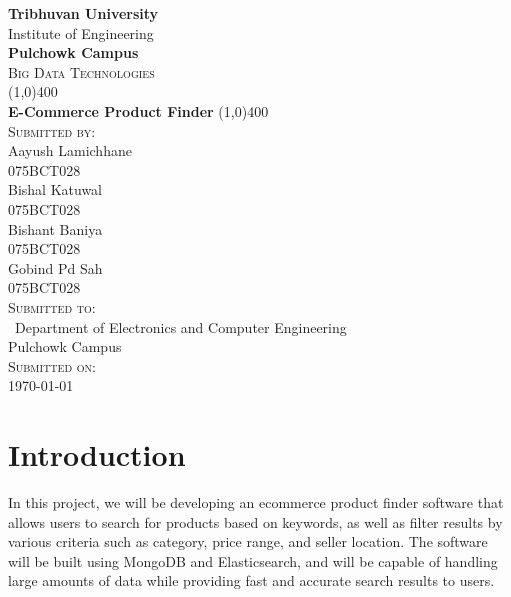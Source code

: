 \documentclass[12pt]{article}
\begin{document}
\begin{titlepage}
    \begin{center}
        \huge{\bfseries  Tribhuvan University}\\
        \Large{Institute of Engineering}\\
        \huge{ \bfseries  Pulchowk Campus}\\[3.2cm]


        \textsc{\Large Big Data Technologies}\\[-0.5cm]
        \line(1,0){400}\\
        \Large{\bfseries E-Commerce Product Finder}
        \line(1,0){400}\\


        \textsc{\Large Submitted by:}\\
        \Large Aayush Lamichhane\\ \large 075BCT028\\    [0.85cm]
        \Large Bishal Katuwal\\ \large 075BCT028\\    [0.85cm]
        \Large Bishant Baniya\\ \large 075BCT028\\    [0.85cm]
        \Large Gobind Pd Sah\\ \large 075BCT028\\    [0.85cm]


        \textsc{\Large Submitted to:}\\\
        \large Department of Electronics and Computer Engineering\\Pulchowk Campus\\    [0.85cm]
        
        \textsc{\Large Submitted on:}\\
        \today
        
    \end{center}
\end{titlepage}
\pagebreak
\tableofcontents
\pagebreak
\listoffigures
\pagebreak
\listoftables
\pagebreak
\section{Introduction}
In this project, we will be developing an ecommerce product finder software that allows users to search for products based on keywords, as well as filter results by various criteria such as category, price range, and seller location. The software will be built using MongoDB and Elasticsearch, and will be capable of handling large amounts of data while providing fast and accurate search results to users.
\end{document}
